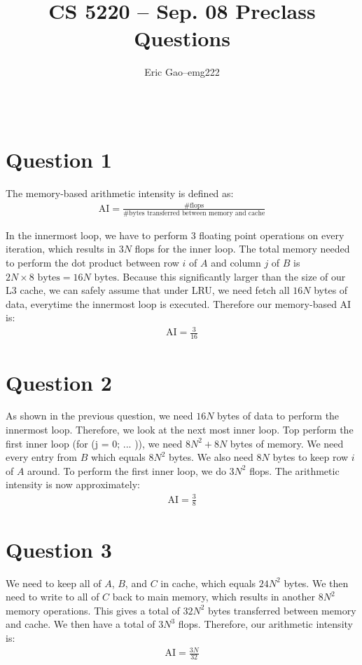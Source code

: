 \documentclass[11pt]{article}
\title{CS 5220 -- Sep. 08 Preclass Questions} %
\author{
  \begin{tabular}{l c l}
    Eric Gao & -- & emg222\\
  \end{tabular}\\
  \rule{\linewidth}{0.4pt}
}
\date{}
\begin{document}
    \thispagestyle{empty}
    \maketitle

    \section*{Question 1}
        The memory-based arithmetic intensity is defined as:
        \begin{align*}
            \text{AI} = \frac{\text{\# flops}}{\text{\# bytes transferred between memory and cache}}
        \end{align*}

        In the innermost loop, we have to perform 3 floating point operations on every iteration, which results in $3N$ flops for the inner loop. The total memory needed to perform the dot product between row $i$ of $A$ and column $j$ of $B$ is $2N\times 8\text{ bytes} = 16N\text{ bytes}$. Because this significantly larger than the size of our L3 cache, we can safely assume that under LRU, we need fetch all $16N$ bytes of data, everytime the innermost loop is executed. Therefore our memory-based AI is:
        \begin{align*}
            \text{AI} = \frac{3}{16}
        \end{align*}

    \section*{Question 2}
        As shown in the previous question, we need $16N$ bytes of data to perform the innermost loop. Therefore, we look at the next most inner loop. Top perform the first inner loop (for (j = 0; ... )), we need $8N^2 + 8N$ bytes of memory. We need every entry from $B$ which equals $8N^2$ bytes. We also need $8N$ bytes to keep row $i$ of $A$ around. To perform the first inner loop, we do $3N^2$ flops. The arithmetic intensity is now approximately:
        \begin{align*}
            \text{AI} = \frac{3}{8}
        \end{align*}

    \section*{Question 3}
        We need to keep all of $A$, $B$, and $C$ in cache, which equals $24N^2$ bytes. We then need to write to all of $C$ back to main memory, which results in another $8N^2$ memory operations. This gives a total of $32N^2$ bytes transferred between memory and cache. We then have a total of $3N^3$ flops. Therefore, our arithmetic intensity is:
        \begin{align*}
            \text{AI} = \frac{3N}{32}
        \end{align*}
\end{document}
